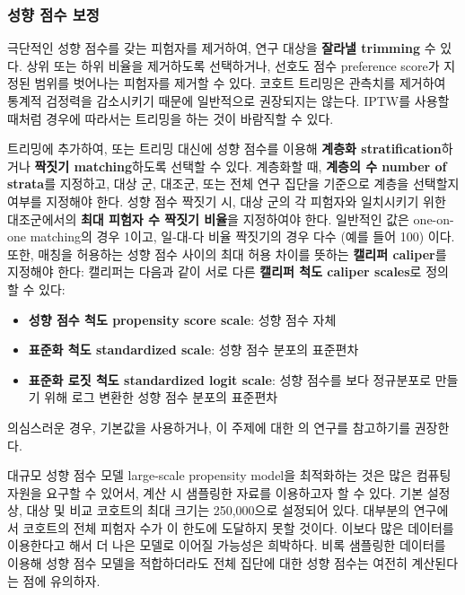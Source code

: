 \documentclass[10.5pt]{book}
\providecommand{\tightlist}{%
  \setlength{\itemsep}{0pt}\setlength{\parskip}{0pt}}
\theoremstyle{definition}
\theoremstyle{definition}
\theoremstyle{definition}
\theoremstyle{remark}
\begin{document}
\subsubsection*{성향 점수 보정}\label{--}

극단적인 성향 점수를 갖는 피험자를 제거하여, 연구 대상을 \textbf{잘라낼
trimming} 수 있다. 상위 또는 하위 비율을 제거하도록 선택하거나, 선호도
점수 preference score가 지정된 범위를 벗어나는 피험자를 제거할 수 있다.
코호트 트리밍은 관측치를 제거하여 통계적 검정력을 감소시키기 때문에
일반적으로 권장되지는 않는다. IPTW를 사용할 때처럼 경우에 따라서는
트리밍을 하는 것이 바람직할 수 있다. 

트리밍에 추가하여, 또는 트리밍 대신에 성향 점수를 이용해 \textbf{계층화
stratification}하거나 \textbf{짝짓기 matching}하도록 선택할 수 있다.
계층화할 때, \textbf{계층의 수 number of strata}를 지정하고, 대상 군,
대조군, 또는 전체 연구 집단을 기준으로 계층을 선택할지 여부를 지정해야
한다. 성향 점수 짝짓기 시, 대상 군의 각 피험자와 일치시키기 위한
대조군에서의 \textbf{최대 피험자 수 짝짓기 비율}을 지정하여야 한다.
일반적인 값은 one-on-one matching의 경우 1이고, 일-대-다 비율 짝짓기의
경우 다수 (예를 들어 100) 이다. 또한, 매칭을 허용하는 성향 점수 사이의
최대 허용 차이를 뜻하는 \textbf{캘리퍼 caliper}를 지정해야 한다:
캘리퍼는 다음과 같이 서로 다른 \textbf{캘리퍼 척도 caliper scales}로
정의할 수 있다: 

\begin{itemize}
\tightlist
\item
  \textbf{성향 점수 척도 propensity score scale}: 성향 점수 자체
\item
  \textbf{표준화 척도 standardized scale}: 성향 점수 분포의 표준편차
\item
  \textbf{표준화 로짓 척도 standardized logit scale}: 성향 점수를 보다
  정규분포로 만들기 위해 로그 변환한 성향 점수 분포의 표준편차
\end{itemize}

의심스러운 경우, 기본값을 사용하거나, 이 주제에 대한 \citet{austin_2011}
의 연구를 참고하기를 권장한다.

대규모 성향 점수 모델 large-scale propensity model을 최적화하는 것은
많은 컴퓨팅 자원을 요구할 수 있어서, 계산 시 샘플링한 자료를 이용하고자
할 수 있다. 기본 설정상, 대상 및 비교 코호트의 최대 크기는 250,000으로
설정되어 있다. 대부분의 연구에서 코호트의 전체 피험자 수가 이 한도에
도달하지 못할 것이다. 이보다 많은 데이터를 이용한다고 해서 더 나은
모델로 이어질 가능성은 희박하다. 비록 샘플링한 데이터를 이용해 성향 점수
모델을 적합하더라도 전체 집단에 대한 성향 점수는 여전히 계산된다는 점에
유의하자.
\end{document}
